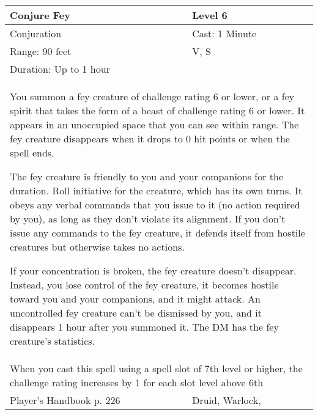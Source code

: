 \documentclass[11pt]{report}
\begin{document}
\begin{table}[H]
	\begin{tabular}{||p{6cm}|p{6cm}||}
		\hline\hline
		\bf{Conjure Fey} & Level 6\\ \hline
		Conjuration & Cast: 1 Minute\\ \hline
		Range: 90 feet & V, S\\ \hline
		Duration: Up to 1 hour & \\ \hline
		\multicolumn{2}{||p{12cm}||}{You summon a fey creature of challenge rating 6 or lower, or a fey spirit that takes the form of a beast of challenge rating 6 or lower. 
It appears in an unoccupied space that you can see within range. The fey creature disappears when it drops to 0 hit points or when the spell ends. 

The fey creature is friendly to you and your companions for the duration. Roll initiative for the creature, which has its own turns. It obeys any verbal commands that you issue to it (no action required by you), as long as they don’t violate its alignment. If you don’t issue any commands to the fey creature, it defends itself from hostile creatures but otherwise takes no actions. 

If your concentration is broken, the fey creature doesn’t disappear. Instead, you lose control of the fey creature, it becomes hostile toward you and your companions, and it might attack. An uncontrolled fey creature can’t be dismissed by you, and it disappears 1 hour after you summoned it. 
The DM has the fey creature’s statistics.}\\ \hline
		\multicolumn{2}{||p{12cm}||}{When you cast this spell using a spell slot of 7th level or higher, the challenge rating increases by 1 for each slot level above 6th}\\ \hline
Player's Handbook p. 226 & Druid, Warlock, \\ \hline\hline
	\end{tabular}
\end{table}
\end{document}
